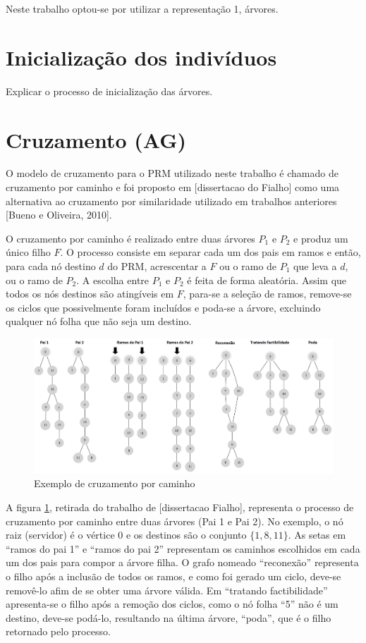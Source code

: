 Neste trabalho optou-se por utilizar a representação 1, árvores.

\section{Inicialização dos indivíduos}
Explicar o processo de inicialização das árvores.

\section{Cruzamento (AG)}

O modelo de cruzamento para o PRM utilizado neste trabalho é chamado de cruzamento por caminho e foi proposto em [dissertacao do Fialho] como uma alternativa ao cruzamento por similaridade utilizado em trabalhos anteriores [Bueno e Oliveira, 2010].

O cruzamento por caminho é realizado entre duas árvores $P_1$ e $P_2$ e produz um único filho $F$. O processo consiste em separar cada um dos pais em ramos e então, para cada nó destino $d$ do PRM, acrescentar a $F$ ou o ramo de $P_1$ que leva a $d$, ou o ramo de $P_2$. A escolha entre $P_1$ e $P_2$ é feita de forma aleatória. Assim que todos os nós destinos são atingíveis em $F$, para-se a seleção de ramos, remove-se os ciclos que possivelmente foram incluídos e poda-se a árvore, excluindo qualquer nó folha que não seja um destino.

\begin{figure}[!htbp]
	\label{fig_prm-cruzamento-caminho}
	\caption{Exemplo de cruzamento por caminho}
	\centering
	\includegraphics[width=1\textwidth]{cap_estrategias-prm/figs/prm-cruzamento-caminho}
\end{figure}

A figura \ref{fig_prm-cruzamento-caminho}, retirada do trabalho de [dissertacao Fialho], representa o processo de cruzamento por caminho entre duas árvores (Pai 1 e Pai 2). No exemplo, o nó raiz (servidor) é o vértice 0 e os destinos são o conjunto $\{1, 8, 11\}$. As setas em ``ramos do pai 1'' e ``ramos do pai 2'' representam os caminhos escolhidos em cada um dos pais para compor a árvore filha. O grafo nomeado ``reconexão'' representa o filho após a inclusão de todos os ramos, e como foi gerado um ciclo, deve-se removê-lo afim de se obter uma árvore válida. Em ``tratando factibilidade'' apresenta-se o filho após a remoção dos ciclos, como o nó folha ``5'' não é um destino, deve-se podá-lo, resultando na última árvore, ``poda'', que é o filho retornado pelo processo.

